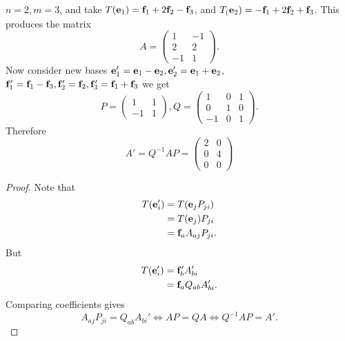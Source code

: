 \documentclass[10pt]{article}
\begin{document}
    \begin{example}
        $n=2,m=3$, and take $ T({\bf e}_1) = {\bf f}_1+2{\bf f}_2-{\bf f}_3 $, and $ T_({\bf e}_2)=-{\bf f}_1+2{\bf f}_2+{\bf f}_3 $. This produces the matrix 
        \[
            A=\begin{pmatrix}
                1&-1\\
                2&2\\
                -1&1
            \end{pmatrix}.
        \]
        Now consider new bases $ {\bf e}_1'={\bf e}_1-{\bf e}_2, {\bf e}_2'={\bf e}_1+{\bf e}_2 $, $ {\bf f}_1'= {\bf f}_1-{\bf f}_3, {\bf f}_2'={\bf f}_2, {\bf f}_3'={\bf f}_1+{\bf f}_3$ we get 
        \[
            P=\begin{pmatrix}
                1&1\\
                -1&1
            \end{pmatrix},
            Q=\begin{pmatrix}
                1&0&1\\
                0&1&0\\
                -1&0&1
            \end{pmatrix}.
        \]
        Therefore 
        \[
            A'=Q^{-1}AP=\begin{pmatrix}
                2&0\\
                0&4\\
                0&0
            \end{pmatrix}
        \]
    \end{example}
    \begin{proof}
        Note that 
        \begin{align*}
            T({\bf e}_i')&= T({\bf e}_jP_{ji})\\
            &=T({\bf e}_j)P_{ji}\\
            &= {\bf f}_aA_{aj}P_{ji}.
        \end{align*}
        But
        \begin{align*}
            T({\bf e}_i')&= {\bf f}_b' A_{bi}'\\
            &= {\bf f}_aQ_{ab}A_{bi}'.
        \end{align*}
        Comparing coefficients gives
        \[
            A_{aj}P_{ji}=Q_{ab}A_{bi}' \Longleftrightarrow AP=QA \Longleftrightarrow Q^{-1}AP=A'.
        \]
        
    \end{proof}
\end{document}
